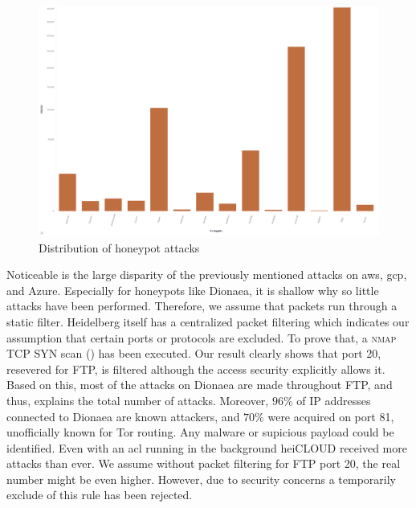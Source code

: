 \begin{figure}[h]
    \centering
    \includegraphics[width=\textwidth]{figures/tpot-overview-attacks.png}
    \caption[Distribution of honeypot attacks]{Distribution of honeypot attacks}
    \label{fig:overview-attacks}
\end{figure}

Noticeable is the large disparity of the previously mentioned attacks on \ac{aws}, \ac{gcp}, and Azure.
Especially for honeypots like Dionaea, it is shallow why so little attacks have been performed.
Therefore, we assume that packets run through a static filter. 
Heidelberg itself has a centralized packet filtering which indicates our assumption that certain ports or protocols are excluded.
To prove that, a \textsc{nmap} TCP SYN scan () has been executed.
Our result clearly shows that port 20, resevered for FTP, is filtered although the access security explicitly allows it.
Based on this, most of the attacks on Dionaea are made throughout FTP, and thus, explains the total number of attacks.
Moreover, $96\%$ of IP addresses connected to Dionaea are known attackers, and $70\%$ were acquired on port 81, unofficially known for Tor routing.
Any malware or supicious payload could be identified.
Even with an \ac{acl} running in the background heiCLOUD received more attacks than ever.
We assume without packet filtering for FTP port 20, the real number might be even higher.
However, due to security concerns a temporarily exclude of this rule has been rejected.

